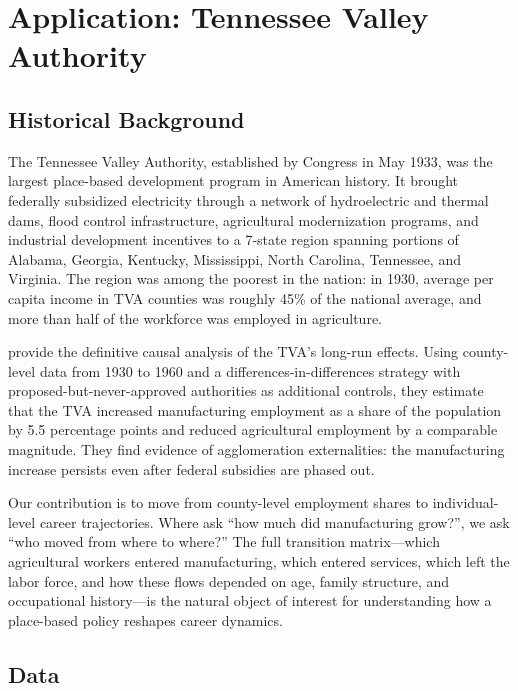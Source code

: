 \documentclass[12pt]{article}
\begin{document}
\section{Application: Tennessee Valley Authority}\label{sec:application}

\subsection{Historical Background}

The Tennessee Valley Authority, established by Congress in May 1933, was the largest place-based development program in American history. It brought federally subsidized electricity through a network of hydroelectric and thermal dams, flood control infrastructure, agricultural modernization programs, and industrial development incentives to a 7-state region spanning portions of Alabama, Georgia, Kentucky, Mississippi, North Carolina, Tennessee, and Virginia. The region was among the poorest in the nation: in 1930, average per capita income in TVA counties was roughly 45\% of the national average, and more than half of the workforce was employed in agriculture.

\citet{klineMoretti2014local} provide the definitive causal analysis of the TVA's long-run effects. Using county-level data from 1930 to 1960 and a differences-in-differences strategy with proposed-but-never-approved authorities as additional controls, they estimate that the TVA increased manufacturing employment as a share of the population by 5.5 percentage points and reduced agricultural employment by a comparable magnitude. They find evidence of agglomeration externalities: the manufacturing increase persists even after federal subsidies are phased out.

Our contribution is to move from county-level employment shares to individual-level career trajectories. Where \citet{klineMoretti2014local} ask ``how much did manufacturing grow?'', we ask ``who moved from where to where?'' The full transition matrix---which agricultural workers entered manufacturing, which entered services, which left the labor force, and how these flows depended on age, family structure, and occupational history---is the natural object of interest for understanding how a place-based policy reshapes career dynamics.

\subsection{Data}
\end{document}
